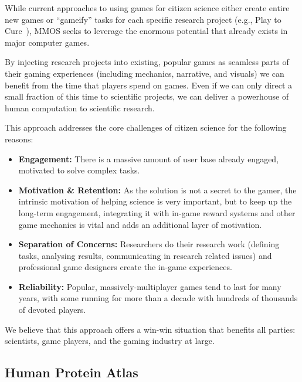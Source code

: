 	While current approaches to using games for citizen science either create entire new games or ``gameify'' tasks for each specific research project (e.g., Play to Cure~\cite{playtocure}), MMOS seeks to leverage the enormous potential that already exists in major computer games. 

	By injecting research projects into existing, popular games as seamless parts of their gaming experiences (including mechanics, narrative, and visuals) we can benefit from the time that players spend on games. Even if we can only direct a small fraction of this time to scientific projects, we can deliver a powerhouse of human computation to scientific research.

	This approach addresses the core challenges of citizen science for the following reasons:

	\begin{itemize}
	  \item {\bf Engagement:} There is a massive amount of user base already engaged, motivated to
	  solve complex tasks.
	  \item {\bf Motivation \& Retention:} As the solution is not a secret to the gamer, the intrinsic motivation of
	  helping science is very important, but to keep up the long-term engagement,
	  integrating it with in-game reward systems and other game mechanics is vital
	  and adds an additional layer of motivation.
	  \item {\bf Separation of Concerns:} Researchers do their research work
	  (defining tasks, analysing results, communicating in research related issues)
	  and professional game designers create the in-game experiences.
	  \item {\bf Reliability:} Popular, massively-multiplayer games tend to last for many years, with some running for more than a decade
	  with hundreds of thousands of devoted players.
	\end{itemize}

	We believe that this approach offers a win-win situation that benefits all parties: scientists, game players, and the gaming industry at large. 

\subsection{Human Protein Atlas}
